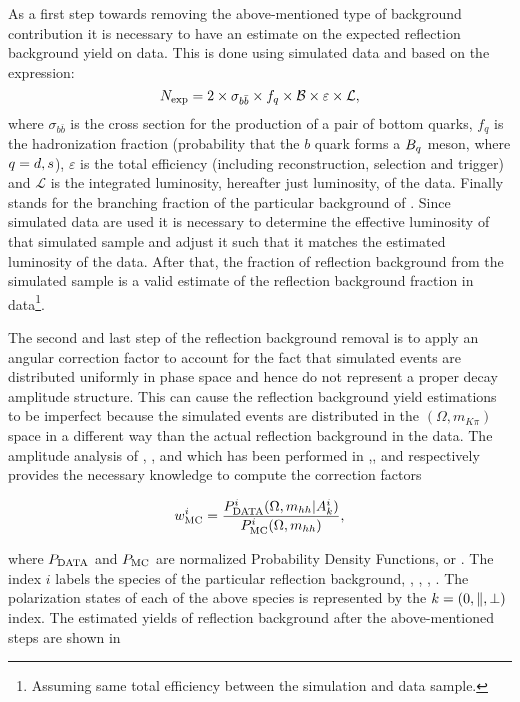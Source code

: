 As a first step towards removing the above-mentioned type of background contribution it is necessary to have an estimate
on the expected reflection background yield on data. This is done using simulated data and based on the expression:
\begin{equation}
N_{\rm exp} = 2 \times \sigma_{b\bar{b}}\times f_q \times {\ensuremath{\cal B}} \times \varepsilon \times {\mathcal{L}},
\end{equation}
\noindent where $\sigma_{b\bar{b}}$ is the cross section for the production of a pair of bottom quarks, $f_q$ is the hadronization fraction
(probability that the $b$ quark forms a $B_q$ meson, where $q=d,s$), $\varepsilon$ is the total efficiency (including reconstruction,
selection and trigger) and ${\mathcal{L}}$ is the integrated luminosity, hereafter just luminosity, of the data. Finally \BF stands for the
branching fraction of the particular background of . Since simulated data are used it is necessary to determine
the effective luminosity of that simulated sample and adjust it such that it matches the estimated luminosity of the data.
After that, the fraction of reflection background from the simulated sample is a valid estimate of the reflection background fraction
in data\footnote{Assuming same total efficiency between the simulation and data sample.}.

The second and last step of the reflection background removal is to apply an angular correction factor to account for the fact that
simulated events are distributed uniformly in phase space and hence do not represent a proper decay amplitude structure.
This can cause the reflection background yield estimations to be imperfect because the simulated events are distributed in the $(\Omega, m_{K\pi})$ space
in a different way than the actual reflection background in the data. The amplitude analysis of \BdJpsipipi, \BsJpsipipi, \BsJpsiKK and \LbJpsipK
which has been performed in \cite{SheldonBdpipi},\cite{SheldonBspipi},\cite{SheldonKK} and \cite{Gao:1701984} respectively provides
the necessary knowledge to compute the correction factors

\begin{equation}
\centering
w_{\rm MC}^i = \frac{P_{\rm DATA}^i (\Omega, m_{hh}  | A_k^i)} {P_{\rm MC}^i(\Omega, m_{hh})},
\end{equation}

\noindent where $P_{\rm DATA}$ and $P_{\rm MC}$ are normalized Probability Density Functions, or \pdfs.
The index $i$ labels the species of the particular reflection background, \ie \BdJpsipipi, \BsJpsipipi, \BsJpsiKK, \LbJpsipK.
The polarization states of each of the above species is represented by the $k=\left( 0, \parallel, \perp \right)$ index.
The estimated yields of reflection background after the above-mentioned steps are shown in 

